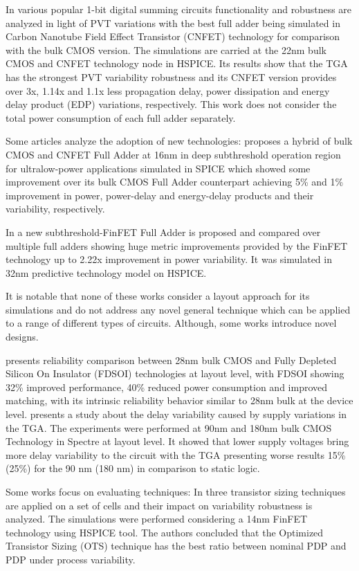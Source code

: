 \documentclass[ecp,tc, english]{iiufrgs}
\begin{document}
In \cite{islam2011design} various popular 1-bit digital summing circuits functionality and robustness are analyzed in light of PVT variations with the best full adder being simulated in Carbon Nanotube Field Effect Transistor (CNFET) technology for comparison with the bulk CMOS version. The simulations are carried at the 22nm bulk CMOS and CNFET technology node in HSPICE. Its results show that the TGA has the strongest PVT variability robustness and its CNFET version provides over 3x, 1.14x and 1.1x less propagation delay, power dissipation and energy delay product (EDP) variations, respectively. This work does not consider the total power consumption of each full adder separately.

Some articles analyze the adoption of new technologies: \cite{guduri2015design} proposes a hybrid of bulk CMOS and CNFET Full Adder at 16nm in deep subthreshold operation region for ultralow-power applications simulated in SPICE which showed some improvement over its bulk CMOS Full Adder counterpart achieving 5\% and 1\% improvement in power, power-delay and energy-delay products and their variability, respectively.  

In \cite{islam2011variability} a new subthreshold-FinFET Full Adder is proposed and compared over multiple full adders showing huge metric improvements provided by the FinFET technology up to 2.22x improvement in power variability. It was simulated in 32nm predictive technology model on HSPICE. 

It is notable that none of these works consider a layout approach for its simulations and do not address any novel general technique which can be applied to a range of different types of circuits. Although, some works introduce novel designs.

\cite{federspiel201228nm} presents reliability comparison between 28nm bulk CMOS and Fully Depleted Silicon On Insulator (FDSOI) technologies at layout level, with FDSOI showing 32\% improved performance, 40\% reduced power consumption and improved matching, with its intrinsic reliability behavior similar to 28nm bulk at the device level. \cite{alioto2007delay} presents a study about the delay variability caused by supply variations in the TGA. The experiments were performed at 90nm and 180nm bulk CMOS Technology in Spectre at layout level. It showed that lower supply voltages bring more delay variability to the circuit with the TGA presenting worse results 15\% (25\%) for the 90 nm (180 nm) in comparison to static logic.

Some works focus on evaluating techniques: In \cite{zimpeck2016finfet} three transistor sizing techniques are applied on a set of cells and their impact on variability robustness is analyzed. The simulations were performed considering a 14nm FinFET technology using HSPICE tool. The authors concluded that the Optimized Transistor Sizing (OTS) technique has the best ratio between nominal PDP and PDP under process variability.
\end{document}
